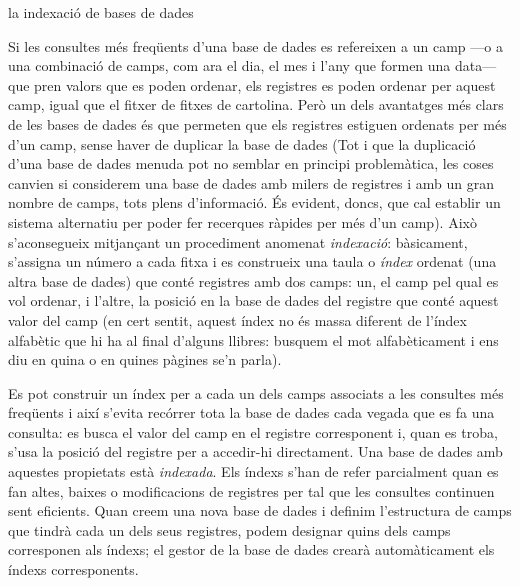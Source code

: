 \begin{persabermes}{la indexació de bases de dades}

  Si les consultes més freqüents d'una base de dades es refereixen a
  un camp ---o a una combinació de camps, com ara el dia, el mes
    i l'any que formen una data--- que pren valors que es poden
  ordenar, els registres es poden ordenar per aquest camp, igual que
  el fitxer de fitxes de cartolina. Però un dels avantatges més clars
  de les bases de dades és que permeten que els registres estiguen
  ordenats per més d'un camp, sense haver de duplicar la base de
  dades (Tot i que la duplicació d'una 
  base de dades menuda pot no semblar en principi problemàtica,
  les coses canvien si considerem una base de dades amb milers de
  registres i amb un gran nombre de camps, tots plens d'informació. 
  És evident, doncs, que cal establir un sistema alternatiu per poder
  fer recerques ràpides per més d'un camp).
  Això s'aconsegueix mitjançant un procediment anomenat
\emph{indexació}: bàsicament, s'assigna un número a cada fitxa i es
construeix una taula o \emph{índex} ordenat (una altra base de dades)
que conté registres amb dos camps: un, el camp pel qual es vol
ordenar, i l'altre, la posició en la base de dades del registre que
conté aquest valor del camp (en cert sentit, aquest índex no és massa
diferent de l'índex alfabètic que hi ha al final d'alguns llibres:
busquem el mot alfabèticament i ens diu en quina o en quines pàgines
se'n parla).

Es pot construir un índex per a cada un dels camps associats a les
consultes més freqüents i així s'evita recórrer tota la base de dades
cada vegada que es fa una consulta: es busca el valor del camp en el
registre corresponent i, quan es troba, s'usa la posició del registre
per a accedir-hi directament. Una base de dades amb aquestes
propietats està \emph{indexada}. 
Els índexs s'han de
refer parcialment quan es fan altes, baixes o modificacions de registres per tal que les
consultes continuen sent eficients. Quan creem una nova base de dades i definim
l'estructura de camps que tindrà cada un dels seus registres, podem
designar quins dels camps corresponen als índexs; el gestor de la base
de dades crearà automàticament els índexs corresponents.


\end{persabermes}
